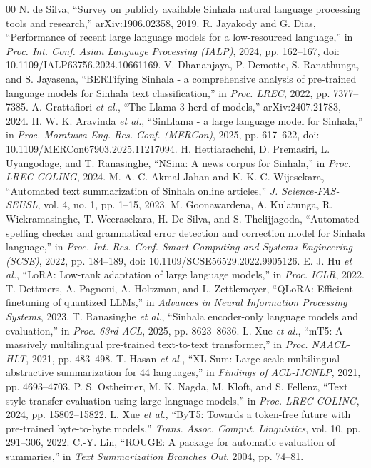 \documentclass[a4paper,conference]{IEEEtran}
\begin{document}
\begin{thebibliography}{00}
 N. de Silva, ``Survey on publicly available Sinhala natural language processing tools and research,'' arXiv:1906.02358, 2019.
 R. Jayakody and G. Dias, ``Performance of recent large language models for a low-resourced language,'' in \textit{Proc. Int. Conf. Asian Language Processing (IALP)}, 2024, pp. 162--167, doi: 10.1109/IALP63756.2024.10661169.
 V. Dhananjaya, P. Demotte, S. Ranathunga, and S. Jayasena, ``BERTifying Sinhala - a comprehensive analysis of pre-trained language models for Sinhala text classification,'' in \textit{Proc. LREC}, 2022, pp. 7377--7385.
 A. Grattafiori \textit{et al.}, ``The Llama 3 herd of models,'' arXiv:2407.21783, 2024.
 H. W. K. Aravinda \textit{et al.}, ``SinLlama - a large language model for Sinhala,'' in \textit{Proc. Moratuwa Eng. Res. Conf. (MERCon)}, 2025, pp. 617--622, doi: 10.1109/MERCon67903.2025.11217094.
 H. Hettiarachchi, D. Premasiri, L. Uyangodage, and T. Ranasinghe, ``NSina: A news corpus for Sinhala,'' in \textit{Proc. LREC-COLING}, 2024.
 M. A. C. Akmal Jahan and K. K. C. Wijesekara, ``Automated text summarization of Sinhala online articles,'' \textit{J. Science-FAS-SEUSL}, vol. 4, no. 1, pp. 1--15, 2023.
 M. Goonawardena, A. Kulatunga, R. Wickramasinghe, T. Weerasekara, H. De Silva, and S. Thelijjagoda, ``Automated spelling checker and grammatical error detection and correction model for Sinhala language,'' in \textit{Proc. Int. Res. Conf. Smart Computing and Systems Engineering (SCSE)}, 2022, pp. 184--189, doi: 10.1109/SCSE56529.2022.9905126.
 E. J. Hu \textit{et al.}, ``LoRA: Low-rank adaptation of large language models,'' in \textit{Proc. ICLR}, 2022.
 T. Dettmers, A. Pagnoni, A. Holtzman, and L. Zettlemoyer, ``QLoRA: Efficient finetuning of quantized LLMs,'' in \textit{Advances in Neural Information Processing Systems}, 2023.
 T. Ranasinghe \textit{et al.}, ``Sinhala encoder-only language models and evaluation,'' in \textit{Proc. 63rd ACL}, 2025, pp. 8623--8636.
 L. Xue \textit{et al.}, ``mT5: A massively multilingual pre-trained text-to-text transformer,'' in \textit{Proc. NAACL-HLT}, 2021, pp. 483--498.
 T. Hasan \textit{et al.}, ``XL-Sum: Large-scale multilingual abstractive summarization for 44 languages,'' in \textit{Findings of ACL-IJCNLP}, 2021, pp. 4693--4703.
 P. S. Ostheimer, M. K. Nagda, M. Kloft, and S. Fellenz, ``Text style transfer evaluation using large language models,'' in \textit{Proc. LREC-COLING}, 2024, pp. 15802--15822.
 L. Xue \textit{et al.}, ``ByT5: Towards a token-free future with pre-trained byte-to-byte models,'' \textit{Trans. Assoc. Comput. Linguistics}, vol. 10, pp. 291--306, 2022.
 C.-Y. Lin, ``ROUGE: A package for automatic evaluation of summaries,'' in \textit{Text Summarization Branches Out}, 2004, pp. 74--81.
\end{thebibliography}
\end{document}
